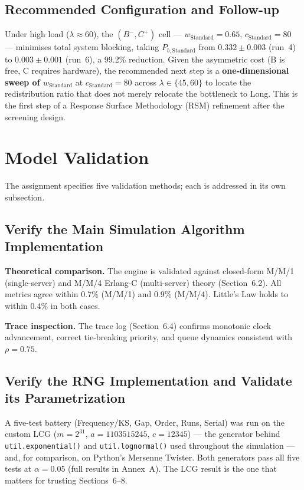 \documentclass[11pt,a4paper]{article}
\newcommand{\lam}{\ensuremath{\lambda}}
\begin{document}
\subsection{Recommended Configuration and Follow-up}

Under high load ($\lam \approx 60$), the $(B^-, C^+)$ cell --- $w_\text{Standard}=0.65$,
$c_\text{Standard}=80$ --- minimises total system blocking, taking $P_{b,\text{Standard}}$ from
$0.332 \pm 0.003$ (run~4) to $0.003 \pm 0.001$ (run~6), a 99.2\% reduction. Given the asymmetric
cost (B is free, C requires hardware), the recommended next step is a \textbf{one-dimensional sweep of
$w_\text{Standard}$} at $c_\text{Standard}=80$ across $\lam \in \{45, 60\}$ to locate the
redistribution ratio that does not merely relocate the bottleneck to Long. This is the first step of a
Response Surface Methodology (RSM) refinement after the screening design.

\section{Model Validation}

The assignment specifies five validation methods; each is addressed in its own subsection.

\subsection{Verify the Main Simulation Algorithm Implementation}

\textbf{Theoretical comparison.} The engine is validated against closed-form M/M/1 (single-server) and
M/M/4 Erlang-C (multi-server) theory (Section~6.2). All metrics agree within 0.7\% (M/M/1) and 0.9\%
(M/M/4). Little's Law holds to within 0.4\% in both cases.

\textbf{Trace inspection.} The trace log (Section~6.4) confirms monotonic clock advancement, correct
tie-breaking priority, and queue dynamics consistent with $\rho=0.75$.

\subsection{Verify the RNG Implementation and Validate its Parametrization}

A five-test battery (Frequency/KS, Gap, Order, Runs, Serial) was run on the custom LCG
($m=2^{31}$, $a=1103515245$, $c=12345$) --- the generator behind \texttt{util.exponential()} and
\texttt{util.lognormal()} used throughout the simulation --- and, for comparison, on Python's Mersenne
Twister. Both generators pass all five tests at $\alpha=0.05$ (full results in Annex~A). The LCG result
is the one that matters for trusting Sections~6--8.
\end{document}
